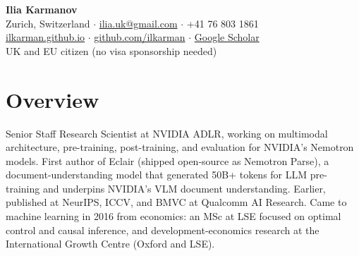 \documentclass[letterpaper,11pt]{article}
\begin{document}
\begin{center}
    {\Huge \textbf{Ilia Karmanov}} \\[6pt]
    \small
    Zurich, Switzerland \quad $\cdot$ \quad
    \href{mailto:ilia.uk@gmail.com}{ilia.uk@gmail.com} \quad $\cdot$ \quad
    +41 76 803 1861 \\[4pt]
    \href{https://ilkarman.github.io}{ilkarman.github.io} \quad $\cdot$ \quad
    \href{https://github.com/ilkarman}{github.com/ilkarman} \quad $\cdot$ \quad
    \href{https://scholar.google.com/citations?user=TAjr_wcAAAAJ}{Google Scholar} \\[4pt]
    UK and EU citizen (no visa sponsorship needed)
\end{center}

\section{Overview}
\small{
Senior Staff Research Scientist at NVIDIA ADLR, working on multimodal architecture, pre-training, post-training, and evaluation for NVIDIA's Nemotron models. First author of Eclair (shipped open-source as Nemotron Parse), a document-understanding model that generated 50B+ tokens for LLM pre-training and underpins NVIDIA's VLM document understanding. Earlier, published at NeurIPS, ICCV, and BMVC at Qualcomm AI Research. Came to machine learning in 2016 from economics: an MSc at LSE focused on optimal control and causal inference, and development-economics research at the International Growth Centre (Oxford and LSE).
}

\end{document}
